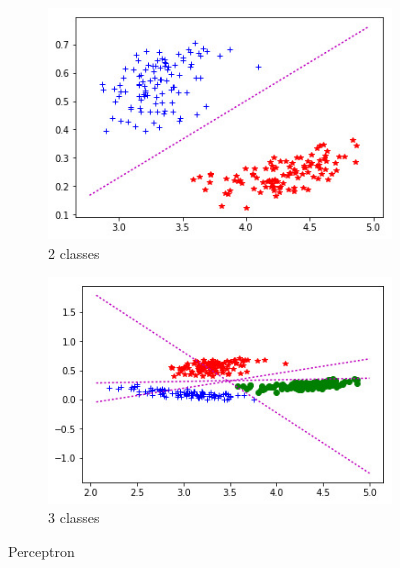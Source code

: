 \documentclass[../thesis.tex]{subfiles}
\begin{document}
    \begin{figure}[H]
        \centering
        
        \begin{subfigure}[b]{0.3\textwidth}
            \centering
            \caption*{2 classes}
            \includegraphics[width=\linewidth]{img/biblio/classification-perceptron-2}
        \end{subfigure}
        \hspace{0.1\linewidth}
        \begin{subfigure}[b]{0.3\textwidth}
            \centering
            \caption*{3 classes}
            \includegraphics[width=\linewidth]{img/biblio/classification-perceptron-3}
        \end{subfigure}
        \caption{Perceptron}
        \label{fig:03-classification-perceptron}
    \end{figure}
    
\end{document}

